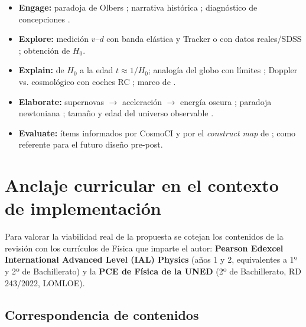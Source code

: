 \begin{itemize}
\item \textbf{Engage:} paradoja de Olbers \parencite{santos2014}; narrativa histórica \parencite{lochner2009,nunes2025}; diagnóstico de concepciones \parencite{colantonio2019}.
\item \textbf{Explore:} medición $v$--$d$ con banda elástica y Tracker \parencite{suarez2025} o con datos reales/SDSS \parencite{hyde2021,cardona2016}; obtención de $H_0$.
\item \textbf{Explain:} de $H_0$ a la edad $t \approx 1/H_0$; analogía del globo con límites \parencite{xu2018}; Doppler vs. cosmológico con coches RC \parencite{marshall2022}; marco de \textcite{possel2020}.
\item \textbf{Elaborate:} supernovas $\rightarrow$ aceleración $\rightarrow$ energía oscura \parencite{hyde2021,raymundo2022}; paradoja newtoniana \parencite{pereira2019}; tamaño y edad del universo observable \parencite{linton2012}.
\item \textbf{Evaluate:} ítems informados por CosmoCI \parencite{salimpour2022} y por el \textit{construct map} de \textcite{aretz2017}; \textcite{gasparini2025} como referente para el futuro diseño pre-post.
\end{itemize}

\section{Anclaje curricular en el contexto de implementación}\label{sec:anclaje}

Para valorar la viabilidad real de la propuesta se cotejan los contenidos de la revisión con los currículos de Física que imparte el autor: \textbf{Pearson Edexcel International Advanced Level (IAL) Physics} (años 1 y 2, equivalentes a 1º y 2º de Bachillerato) y la \textbf{PCE de Física de la UNED} (2º de Bachillerato, RD 243/2022, LOMLOE).

\subsection{Correspondencia de contenidos}

